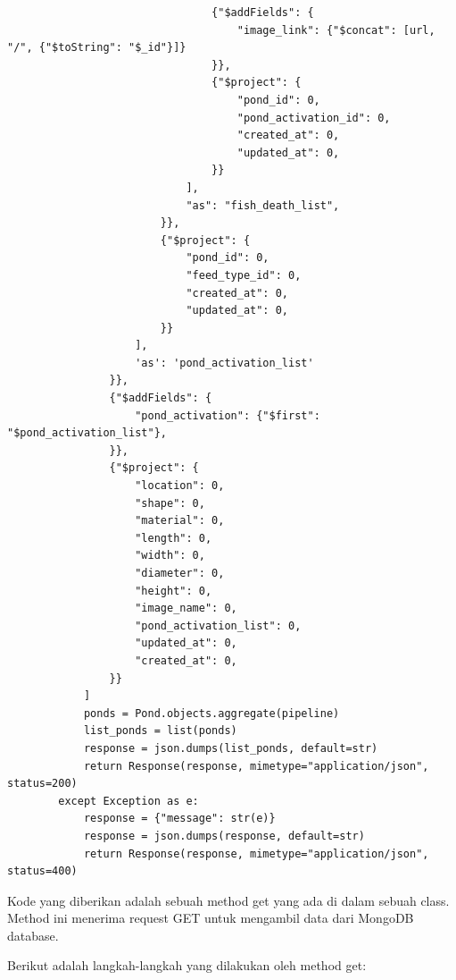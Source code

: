 \begin{enumerate}[1.]
\begin{lstlisting}
                                {"$addFields": {
                                    "image_link": {"$concat": [url, "/", {"$toString": "$_id"}]}
                                }},
                                {"$project": {
                                    "pond_id": 0,
                                    "pond_activation_id": 0,
                                    "created_at": 0,
                                    "updated_at": 0,
                                }}
                            ],
                            "as": "fish_death_list",
                        }},
                        {"$project": {
                            "pond_id": 0,
                            "feed_type_id": 0,
                            "created_at": 0,
                            "updated_at": 0,
                        }}
                    ],
                    'as': 'pond_activation_list'
                }},
                {"$addFields": {
                    "pond_activation": {"$first": "$pond_activation_list"},
                }},
                {"$project": {
                    "location": 0,
                    "shape": 0,
                    "material": 0,
                    "length": 0,
                    "width": 0,
                    "diameter": 0,
                    "height": 0,
                    "image_name": 0,
                    "pond_activation_list": 0,
                    "updated_at": 0,
                    "created_at": 0,
                }}
            ]
            ponds = Pond.objects.aggregate(pipeline)
            list_ponds = list(ponds)
            response = json.dumps(list_ponds, default=str)
            return Response(response, mimetype="application/json", status=200)
        except Exception as e:
            response = {"message": str(e)}
            response = json.dumps(response, default=str)
            return Response(response, mimetype="application/json", status=400)
\end{lstlisting}

Kode yang diberikan adalah sebuah method get yang ada di dalam sebuah class. Method ini menerima request GET untuk mengambil data dari MongoDB database.

Berikut adalah langkah-langkah yang dilakukan oleh method get:


\end{enumerate}
